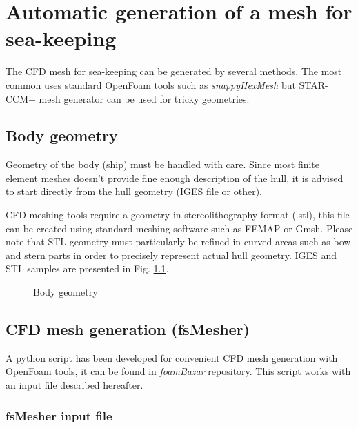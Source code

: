 \chapter{Automatic generation of a mesh for sea-keeping}
\label{mesh}

The CFD mesh for sea-keeping can be generated by several methods. The most common uses standard OpenFoam tools such as \emph{snappyHexMesh} but STAR-CCM+ mesh generator can be used for tricky geometries.

\section{Body geometry}

Geometry of the body (ship) must be handled with care. Since most finite element meshes doesn't provide fine enough description of the hull, it is advised to start directly from the hull geometry (IGES file or other).

CFD meshing tools require a geometry in stereolithography format (.stl), this file can be created using standard meshing software such as FEMAP or Gmsh. Please note that STL geometry must particularly be refined in curved areas such as bow and stern parts in order to precisely represent actual hull geometry. IGES and STL samples are presented in Fig. \ref{geom}.

\begin{figure}[htbp]
\begin{center}
\end{center}
\caption{Body geometry}
\label{geom} 
\end{figure}

\section{CFD mesh generation (fsMesher)}

A python script has been developed for convenient CFD mesh generation with OpenFoam tools,  it can be found in \emph{foamBazar} repository. This script works with an input file described hereafter.

\subsection{fsMesher input file}

